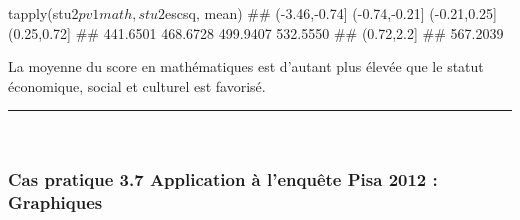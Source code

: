 \documentclass[12pt,twosided, notitlepage]{book}
\newenvironment{Shaded}{}{}
\newcommand{\KeywordTok}[1]{\textcolor[rgb]{0.00,0.00,1.00}{{#1}}}
\newcommand{\NormalTok}[1]{{#1}}
\renewenvironment{Shaded}{\begin{snugshade}}{\end{snugshade}}
\begin{document}
\begin{enumerate}
\begin{Shaded}
\begin{Highlighting}[]
\KeywordTok{tapply}\NormalTok{(stu2$pv1math, stu2$escsq, mean)}
  \NormalTok{## (-3.46,-0.74] (-0.74,-0.21]  (-0.21,0.25]   (0.25,0.72] }
  \NormalTok{##      441.6501      468.6728      499.9407      532.5550 }
  \NormalTok{##    (0.72,2.2] }
  \NormalTok{##      567.2039}
\end{Highlighting}
\end{Shaded}

  La moyenne du score en mathématiques est d'autant plus élevée que le
  statut économique, social et culturel est favorisé.

  \begin{center} \rule{0.5\linewidth}{\linethickness}\end{center}

  \bigskip  \fi 
\end{enumerate}

~

\subsubsection{\texorpdfstring{\textbf{Cas pratique 3.7} Application à
l'enquête Pisa 2012 :
Graphiques}{Cas pratique 3.7 Application à l'enquête Pisa 2012 : Graphiques}}\label{cas-pratique-3.7-application-a-lenquete-pisa-2012-graphiques}

\end{document}

